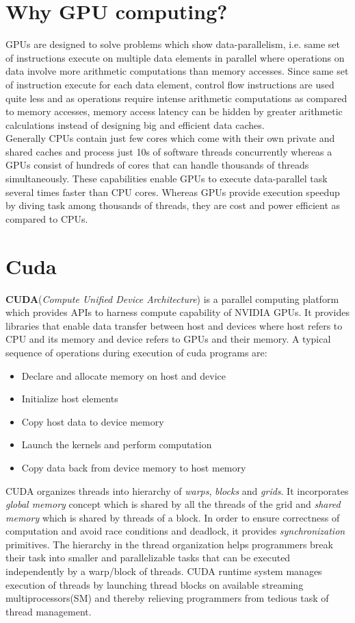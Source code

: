 \documentclass[MTech]{iitmdiss}
\begin{document}
\section{Why GPU computing?} GPUs are designed to solve problems which show data-parallelism, i.e. same set of instructions execute on multiple data elements in parallel where operations on data involve more arithmetic computations than memory accesses. Since same set of instruction execute for each data element, control flow instructions are used quite less and as operations require intense arithmetic computations as compared to memory accesses, memory access latency can be hidden by greater arithmetic calculations instead of designing big and efficient data caches.\\
\indent Generally CPUs contain just few cores which come with their own private and shared caches and process just 10s of software threads concurrently whereas a GPUs consist of hundreds of cores that can handle thousands of threads simultaneously. These capabilities enable GPUs to execute data-parallel task several times faster than CPU cores. Whereas GPUs provide execution speedup by diving task among thousands of threads, they are cost and power efficient as compared to CPUs.

\section{Cuda}

\textbf{CUDA}(\textit{Compute Unified Device Architecture}) is a parallel computing platform which provides APIs to harness compute capability of NVIDIA GPUs. It provides libraries that enable data transfer between host and devices where host refers to CPU and its memory and  device refers to GPUs and their memory. A typical sequence of operations during execution of cuda programs are:
\begin{itemize}
\item Declare and allocate memory on host and device
\item Initialize host elements
\item Copy host data to device memory
\item Launch the kernels and perform computation
\item Copy data back from device memory to host memory
\end{itemize}

 
CUDA organizes threads into hierarchy of \textit{warps}, \textit{blocks} and \textit{ grids}. It incorporates \textit{global memory} concept which is shared by all the threads of the grid and \textit{shared memory} which is shared by threads of a block. In order to ensure correctness of computation and avoid race conditions and deadlock, it provides \textit{synchronization} primitives. The hierarchy in the thread organization helps programmers break their task into smaller and parallelizable tasks that can be executed independently by a warp/block of threads. CUDA runtime system manages execution of threads by launching thread blocks on available streaming multiprocessors(SM) and thereby relieving programmers from tedious task of thread management.
\end{document}
